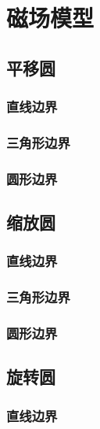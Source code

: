 \documentclass[a4paper,12pt,twoside]{article}
\begin{document}
\section{磁场模型}

\subsection{平移圆}

\subsubsection{直线边界}

\subsubsection{三角形边界}

\subsubsection{圆形边界}


\subsection{缩放圆}

\subsubsection{直线边界}

\subsubsection{三角形边界}

\subsubsection{圆形边界}


\subsection{旋转圆}

\subsubsection{直线边界}
\end{document}
